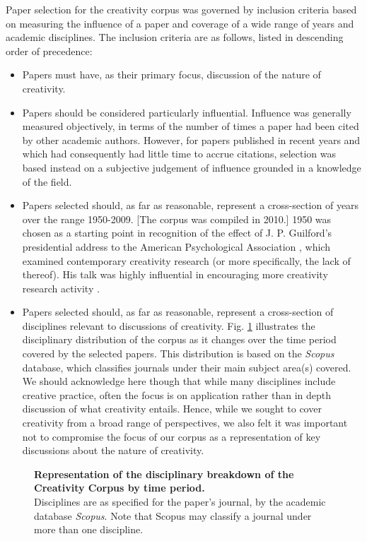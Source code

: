 \documentclass[10pt,letterpaper]{article}
\begin{document}
Paper selection for the creativity corpus was governed by inclusion criteria based on measuring the influence of a paper and coverage of a wide range of years and academic disciplines. The inclusion criteria are as follows, listed in descending order of precedence: 
\begin{itemize}
\item Papers must have, as their primary focus, discussion of the nature of creativity.
\item Papers should be considered particularly influential. Influence was generally measured objectively, in terms of the number of times a paper had been cited by other academic authors. However, for papers published in recent years and which had consequently had little time to accrue citations, selection was based instead on a subjective judgement of influence grounded in a knowledge of the field.
\item Papers selected should, as far as reasonable, represent a cross-section of years over the range 1950-2009. [The corpus was compiled in 2010.] 1950 was chosen as a starting point in recognition of the effect of J. P. Guilford's presidential address to the American Psychological Association \cite{guilford50}, which examined contemporary creativity research (or more specifically, the lack of thereof). His talk was highly influential in encouraging more creativity research activity \cite{kaufman09}. 
\item Papers selected should, as far as reasonable, represent a cross-section of disciplines relevant to discussions of creativity. Fig. \ref{disciplinaryDistribution} illustrates the disciplinary distribution of the corpus as it changes over the time period covered by the selected papers. This distribution is based on the {\em Scopus} database, which classifies journals under their main subject area(s) covered. We should acknowledge here though that while many disciplines include creative practice, often the focus is on application rather than in depth discussion of what creativity entails. Hence, while we sought to cover creativity from a broad range of perspectives, we also felt it was important not to compromise the focus of our corpus as a representation of key discussions about the nature of creativity.
\end{itemize}




\begin{figure}[!b]
\caption{{\bf Representation of the disciplinary breakdown of the Creativity Corpus by time period.} \\Disciplines are as specified for the paper's journal, by the academic database {\em Scopus}. Note that Scopus may classify a journal under more than one discipline.}
\label{disciplinaryDistribution}
\end{figure}  
\end{document}
